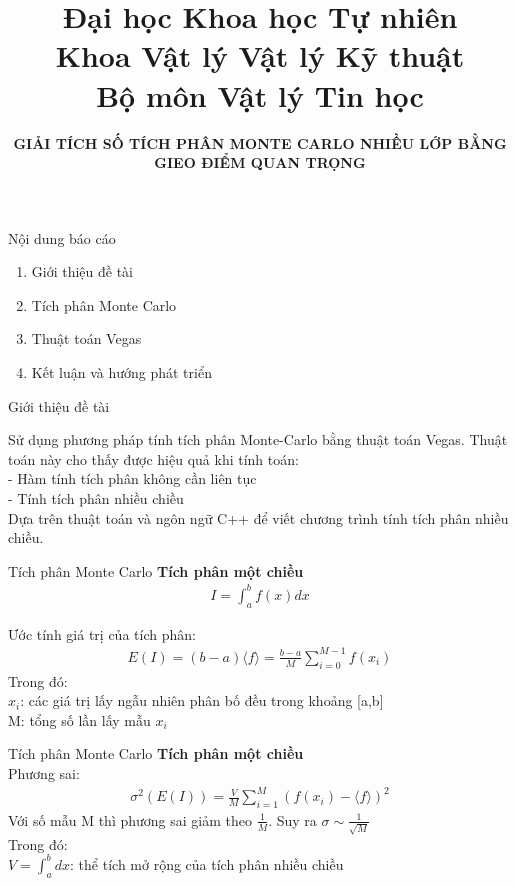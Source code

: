 \documentclass{beamer}
\title[Giải tích số tích phân Monte Carlo nhiều lớp bằng gieo điểm quan trọng]{Đại học Khoa học Tự nhiên\\
Khoa Vật lý Vật lý Kỹ thuật\\
Bộ môn Vật lý Tin học }
\author[Vật lý Tin học]{ \color[rgb]{0.20,0.60,1.0} \Large \textbf{GIẢI TÍCH SỐ TÍCH PHÂN MONTE CARLO NHIỀU LỚP BẰNG GIEO ĐIỂM QUAN TRỌNG}}
\institute[] %
{
  \inst{}%
  \textbf{CBHD}: TS. Nguyễn Chí Linh
  \and
  \inst{}%
  \textbf{SVTH}: Huỳnh Thị Hạ Vy
}
\date[12/07/2019]%
{}
\begin{document}
 
\frame{\titlepage}
\begin{frame}{Nội dung báo cáo}
\fontsize{13pt}{40pt}
\begin{enumerate}
\item Giới thiệu đề tài
\item Tích phân Monte Carlo
\item Thuật toán Vegas
\item Kết luận và hướng phát triển
\end{enumerate}
\end{frame}

\begin{frame}{Giới thiệu đề tài}\vspace{4pt}
\vspace{0.5em}
\color[rgb]{0.0,0.00,0.0}

Sử dụng phương pháp tính tích phân Monte-Carlo bằng thuật toán Vegas. Thuật toán này cho thấy được hiệu quả khi tính toán: \\
- Hàm tính tích phân không cần liên tục\\
- Tính tích phân nhiều chiều \\
Dựa trên thuật toán và ngôn ngữ C++ để viết chương trình tính tích phân nhiều chiều. 

\end{frame}

\begin{frame}{Tích phân Monte Carlo}\vspace{4pt}
  \textbf{Tích phân một chiều}
  \begin{align}
  I=\int_{a}^{b}{f(x)dx}
\end{align}

  Ước tính giá trị của tích phân: 
  \begin{align}
  E(I) = (b-a)\langle{f}\rangle = \frac{b-a}{M}{\sum_{i=0}^{M-1}{f(x_i)}}
\end{align}
Trong đó:\\
  \vspace{1em}
  $x_i$: các giá trị lấy ngẫu nhiên phân bố đều trong khoảng [a,b]\\
  M: tổng số lần lấy mẫu $x_i$\\
\end{frame}

\begin{frame}{Tích phân Monte Carlo}\vspace{4pt}
\textbf{Tích phân một chiều}\\
\vspace{4em}
  Phương sai: 
\begin{align}
  \sigma^2(E(I)) = \frac{V}{M}\sum_{i=1}^M{(f(x_i)-\langle{f}\rangle)^2}
\end{align}
Với số mẫu M thì phương sai giảm theo $\frac{1}{M}$. Suy ra $\sigma \sim \frac{1}{\sqrt{M}}$\\
\vspace{0.5em}
Trong đó:\\
$V=\int_{a}^{b}{dx}$: thể tích mở rộng của tích phân nhiều chiều\\
\end{frame}
\end{document}

